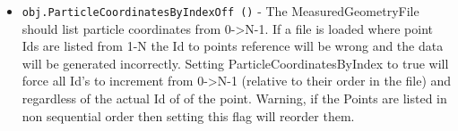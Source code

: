 \begin{itemize}
\item  \verb|obj.ParticleCoordinatesByIndexOff ()| -  The MeasuredGeometryFile should list particle coordinates
 from 0->N-1.
 If a file is loaded where point Ids are listed from 1-N
 the Id to points reference will be wrong and the data
 will be generated incorrectly.
 Setting ParticleCoordinatesByIndex to true will force
 all Id's to increment from 0->N-1 (relative to their order
 in the file) and regardless of the actual Id of of the point.
 Warning, if the Points are listed in non sequential order
 then setting this flag will reorder them.

\end{itemize}
